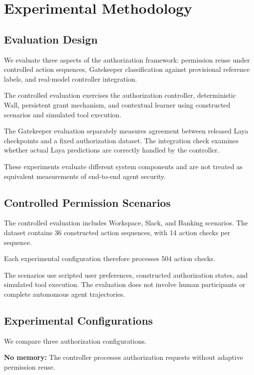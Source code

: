 \documentclass[10pt,conference]{IEEEtran}
\begin{document}
\section{Experimental Methodology}
\label{sec:methodology}

\subsection{Evaluation Design}

We evaluate three aspects of the authorization
framework: permission reuse under controlled
action sequences, Gatekeeper classification
against provisional reference labels, and
real-model controller integration.

The controlled evaluation exercises the
authorization controller, deterministic Wall,
persistent grant mechanism, and contextual
learner using constructed scenarios and
simulated tool execution.

The Gatekeeper evaluation separately measures
agreement between released Laya checkpoints
and a fixed authorization dataset. The
integration check examines whether actual
Laya predictions are correctly handled by
the controller.

These experiments evaluate different system
components and are not treated as equivalent
measurements of end-to-end agent security.

\subsection{Controlled Permission Scenarios}

The controlled evaluation includes Workspace,
Slack, and Banking scenarios. The dataset
contains 36 constructed action sequences,
with 14 action checks per sequence.

Each experimental configuration therefore
processes 504 action checks.

The scenarios use scripted user preferences,
constructed authorization states, and
simulated tool execution. The evaluation
does not involve human participants or
complete autonomous agent trajectories.

\subsection{Experimental Configurations}

We compare three authorization configurations.

\textbf{No memory:}
The controller processes authorization requests
without adaptive permission reuse.
\end{document}
